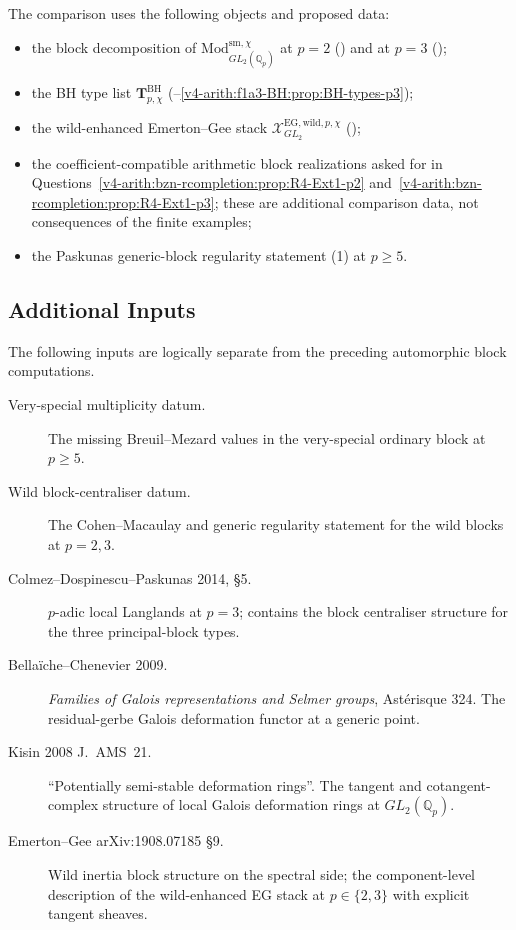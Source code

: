 The comparison uses the following objects and proposed data:
\begin{itemize}
\item the block decomposition of \(\mathrm{Mod}^{\mathrm{sm},\chi}_{GL_{2}(\mathbb{Q}_{p})}\) at
\(p=2\) () and at \(p=3\)
();
\item the BH type list
\(\mathbf{T}^{\mathrm{BH}}_{p,\chi}\)
(--\ref{v4-arith:f1a3-BH:prop:BH-types-p3});
\item the wild-enhanced Emerton--Gee stack
\(\mathcal{X}^{\mathrm{EG,wild},p,\chi}_{GL_{2}}\)
();
\item the coefficient-compatible arithmetic block realizations asked
for in Questions~\ref{v4-arith:bzn-rcompletion:prop:R4-Ext1-p2}
and~\ref{v4-arith:bzn-rcompletion:prop:R4-Ext1-p3}; these are
additional comparison data, not consequences of the finite examples;
\item the Paskunas generic-block regularity statement
(1) at \(p\geq 5\).
\end{itemize}

\subsection{Additional Inputs}

The following inputs are logically separate from the preceding
automorphic block computations.
\begin{description}
\item[Very-special multiplicity datum.] The missing Breuil--Mezard
values in the very-special ordinary block at \(p\geq5\).
\item[Wild block-centraliser datum.] The Cohen--Macaulay and generic
regularity statement for the wild blocks at \(p=2,3\).
\item[Colmez--Dospinescu--Paskunas 2014, \S 5.]
\(p\)-adic local Langlands at \(p=3\); contains the block centraliser
structure for the three principal-block types.
\item[Bella\"iche--Chenevier 2009.] \emph{Families of Galois
representations and Selmer groups}, Ast\'erisque 324. The
residual-gerbe Galois deformation functor at a generic point.
\item[Kisin 2008 J.~AMS~21.] ``Potentially semi-stable
deformation rings''. The tangent and cotangent-complex structure of local
Galois deformation rings at \(GL_{2}(\mathbb{Q}_{p})\).
\item[Emerton--Gee arXiv:1908.07185 \S 9.] Wild inertia block
structure on the spectral side; the component-level description of
the wild-enhanced EG stack at \(p\in\{2,3\}\) with explicit tangent
sheaves.
\end{description}

